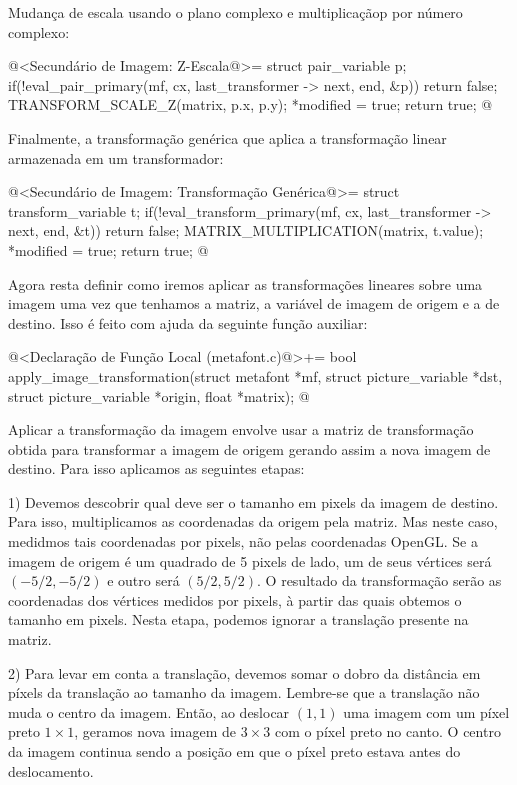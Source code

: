 {{{{{{Mudança de escala usando o plano complexo e multiplicaçãop por número
complexo:

\iniciocodigo
@<Secundário de Imagem: Z-Escala@>=
struct pair_variable p;
if(!eval_pair_primary(mf, cx, last_transformer -> next, end, &p))
  return false;
TRANSFORM_SCALE_Z(matrix, p.x, p.y);
*modified = true;
return true;
@
\fimcodigo

Finalmente, a transformação genérica que aplica a transformação linear
armazenada em um transformador:

\iniciocodigo
@<Secundário de Imagem: Transformação Genérica@>=
struct transform_variable t;
if(!eval_transform_primary(mf, cx, last_transformer -> next, end, &t))
  return false;
MATRIX_MULTIPLICATION(matrix, t.value);
*modified = true;
return true;
@
\fimcodigo

Agora resta definir como iremos aplicar as transformações lineares
sobre uma imagem uma vez que tenhamos a matriz, a variável de imagem
de origem e a de destino. Isso é feito com ajuda da seguinte função
auxiliar:

\iniciocodigo
@<Declaração de Função Local (metafont.c)@>+=
bool apply_image_transformation(struct metafont *mf,
                                struct picture_variable *dst,
                                struct picture_variable *origin,
                                float *matrix);
@
\fimcodigo

Aplicar a transformação da imagem envolve usar a matriz de
transformação obtida para transformar a imagem de origem gerando assim
a nova imagem de destino. Para isso aplicamos as seguintes etapas:

1) Devemos descobrir qual deve ser o tamanho em pixels da imagem de
destino. Para isso, multiplicamos as coordenadas da origem pela
matriz. Mas neste caso, medidmos tais coordenadas por pixels, não
pelas coordenadas OpenGL. Se a imagem de origem é um quadrado de 5
pixels de lado, um de seus vértices será $(-5/2, -5/2)$ e outro será
$(5/2, 5/2)$. O resultado da transformação serão as coordenadas dos
vértices medidos por pixels, à partir das quais obtemos o tamanho em
pixels. Nesta etapa, podemos ignorar a translação presente na matriz.

2) Para levar em conta a translação, devemos somar o dobro da
distância em píxels da translação ao tamanho da imagem. Lembre-se que a
translação não muda o centro da imagem. Então, ao deslocar $(1, 1)$
uma imagem com um píxel preto $1\times 1$, geramos nova imagem de
$3\times 3$ com o píxel preto no canto. O centro da imagem continua
sendo a posição em que o píxel preto estava antes do deslocamento.

}}}}}}
